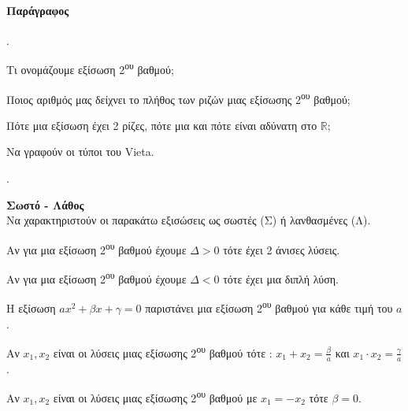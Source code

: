 \documentclass[11pt,a4paper,twocolumn]{article}
\newcounter{askhsh}
\newcommand{\askhsh}{\large\theaskhsh.\ \addtocounter{askhsh}{1}}
\begin{document}
\paragraph{Παράγραφος}
\askhsh 
\begin{alist}
\item Τι ονομάζουμε εξίσωση 2\textsuperscript{ου} βαθμού;
\item Ποιος αριθμός μας δείχνει το πλήθος των ριζών μιας εξίσωσης 2\textsuperscript{ου} βαθμού;
\item Πότε μια εξίσωση έχει 2 ρίζες, πότε μια και πότε είναι αδύνατη στο $ \mathbb{R} $;
\item Να γραφούν οι τύποι του Vieta.
\end{alist}
\askhsh \textbf{Σωστό - Λάθος}\\
Να χαρακτηριστούν οι παρακάτω εξισώσεις ως σωστές (Σ) ή λανθασμένες (Λ).
\begin{alist}[leftmargin=4mm]
\item Αν για μια εξίσωση 2\textsuperscript{ου} βαθμού έχουμε $ \varDelta>0 $ τότε έχει 2 άνισες λύσεις.
\item Αν για μια εξίσωση 2\textsuperscript{ου} βαθμού έχουμε $ \varDelta<0 $ τότε έχει μια διπλή λύση.
\item Η εξίσωση $ ax^2+\beta x+\gamma=0 $ παριστάνει μια εξίσωση 2\textsuperscript{ου} βαθμού για κάθε τιμή του $ a $.
\item Αν $ x_1, x_2 $ είναι οι λύσεις μιας εξίσωσης 2\textsuperscript{ου} βαθμού τότε : $ x_1+x_2=\frac{\beta}{a} $ και $ x_1\cdot x_2=\frac{\gamma}{a} $.
\item Αν $ x_1, x_2 $ είναι οι λύσεις μιας εξίσωσης 2\textsuperscript{ου} βαθμού με $ x_1=-x_2 $ τότε $ \beta=0 $.
\end{alist}
\end{document}
